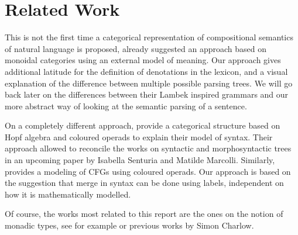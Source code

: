 \section{Related Work}
This is not the first time a categorical representation of compositional
semantics of natural language is proposed,
\cite{coeckeMathematicalFoundationsCompositional2010} already suggested an
approach based on monoidal categories using an external model of meaning.
Our approach gives additional latitude for the definition of denotations in the
lexicon, and a visual explanation of the difference between multiple possible
parsing trees.
We will go back later on the differences between their Lambek inspired grammars
and our more abstract way of looking at the semantic parsing of a sentence.

\smallskip

On a completely different approach,
\cite{marcollimatildeetchomskynoametberwickrobertc.MathematicalStructureSyntactic}
provide a categorical structure based on Hopf algebra and coloured operads
to explain their model of syntax.
Their approach allowed to reconcile the works on syntactic and
morphosyntactic trees in an upcoming paper by Isabella Senturia and Matilde
Marcolli.
Similarly, \cite{melliesCategoricalContoursChomskySchutzenberger2025} provides
a modeling of CFGs using coloured operads.
Our approach is based on the suggestion that merge in syntax can be done using
labels, independent on how it is mathematically modelled.

\smallskip

Of course, the works most related to this report are the ones on the notion of
monadic types, see for example \cite{asudehEnrichedMeaningsNatural2020} or
previous works by Simon Charlow.
